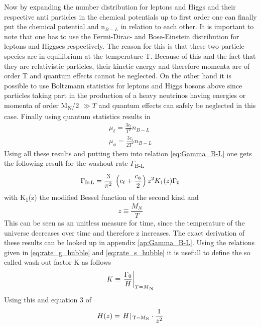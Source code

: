 Now by expanding the number distribution for leptons and Higgs and their respective anti particles in the chemical potentials up to first order one can finally put the chemical potential and n$_{B-L}$ in relation to each other. It is important to note that one has to use the Fermi-Dirac- and Bose-Einstein distribution for leptons and Higgses respectively. The reason for this is that these two particle species are in equilibrium at the temperature T. Because of this and the fact that they are relativistic particles, their kinetic energy and therefore momenta are of order T and quantum effects cannot be neglected. On the other hand it is possible to use Boltzmann statistics for leptons and Higgs bosons above since particles taking part in the production of a heavy neutrinos having energies or momenta of order M\textsubscript{N}/2 $\gg T$ and quantum effects can safely be neglected in this case. Finally using quantum statistics results in
\begin{align}
\mu_\ell=\frac{3c_l}{T^2}n_{B-L}
\label{eq:chempot_l}
\\
\mu_\phi=\frac{3c_l}{2T^2}n_{B-L}
\label{eq:chempot_phi}
\end{align}
Using all these results and putting them into relation \eqref{eq:Gamma_B-L} one gets the following result for the washout rate $\Gamma$\textsubscript{B-L}
\begin{equation}
	\Gamma\textsubscript{B-L}=\frac{3}{\pi^2}\:\left(c_\ell+\frac{c_\phi}{2}\right)z^2K_1(z)\Gamma_0
	\label{eq:Gamma_B-l_result}
\end{equation}
with K\textsubscript{1}(z) the modified Bessel function of the second kind and 
\begin{equation}
	z\equiv\frac{M_N}{T}
\end{equation}
This can be seen as an unitless measure for time, since the temperature of the universe decreases over time and therefore z increases. 
The exact derivation of these results can be looked up in appendix \ref{ap:Gamma_B-L}. \newline
Using the relations given in \eqref{eq:rate_g_hubble} and \eqref{eq:rate_s_hubble} it is usefull to define the so called wash out factor K as follows
\begin{equation}
	K\equiv\left.\frac{\Gamma_0}{H}\right|_{T=M\textsubscript{N}}
	\label{eq:washout}
\end{equation}
Using this and equation 3 of \cite{Buchmuller:2004nz}
\begin{equation}
	H(z)=\left.H\right|\textsubscript{T=M\textsubscript{N}}\cdot \frac{1}{z^2}
	\label{eq:H_von_z}
\end{equation}
